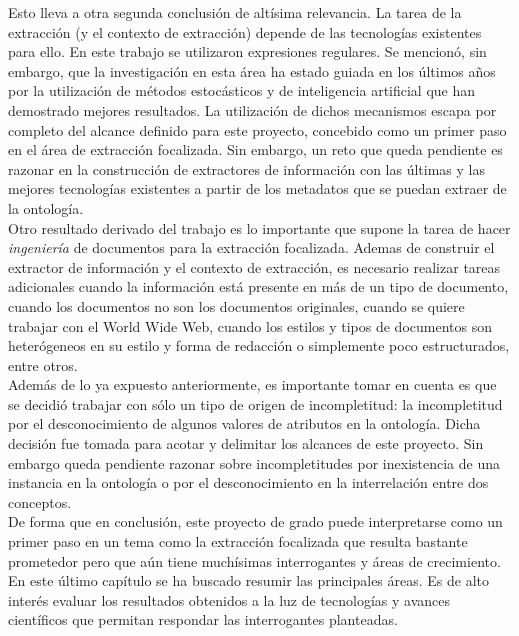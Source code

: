 Esto lleva a otra segunda conclusión de altísima relevancia. La tarea de la extracción (y el contexto de extracción) depende de las tecnologías existentes para ello. En este trabajo se utilizaron expresiones regulares. Se mencionó, sin embargo, que la investigación en esta área ha estado guiada en los últimos años por la utilización de métodos estocásticos y de inteligencia artificial que han demostrado mejores resultados. La utilización de dichos mecanismos escapa por completo del alcance definido para este proyecto, concebido como un primer paso en el área de extracción focalizada. Sin embargo, un reto que queda pendiente es razonar en la construcción de extractores de información con las últimas y las mejores tecnologías existentes a partir de los metadatos que se puedan extraer de la ontología. \\

Otro resultado derivado del trabajo es lo importante que supone la tarea de hacer \emph{ingeniería} de documentos para la extracción focalizada. Ademas de construir el extractor de información y el contexto de extracción, es necesario realizar tareas adicionales cuando la información está presente en más de un tipo de documento, cuando los documentos no son los documentos originales, cuando se quiere trabajar con el World Wide Web, cuando los estilos y tipos de documentos son heterógeneos en su estilo y forma de redacción o simplemente poco estructurados, entre otros.\\

Además de lo ya expuesto anteriormente, es importante tomar en cuenta es que se decidió trabajar con sólo un tipo de origen de incompletitud: la incompletitud por el desconocimiento de algunos valores de atributos en la ontología. Dicha decisión fue tomada para acotar y delimitar los alcances de este proyecto. Sin embargo queda pendiente razonar sobre incompletitudes por inexistencia de una instancia en la ontología o por el desconocimiento en la interrelación entre dos conceptos. \\

De forma que en conclusión, este proyecto de grado puede interpretarse como un primer paso en un tema como la extracción focalizada que resulta bastante prometedor pero que aún tiene muchísimas interrogantes y áreas de crecimiento. En este último capítulo se ha buscado resumir las principales áreas. Es de alto interés evaluar los resultados obtenidos a la luz de tecnologías y avances científicos que permitan respondar las interrogantes planteadas. \\